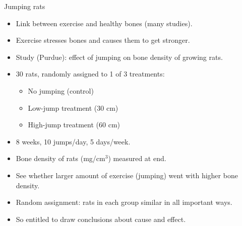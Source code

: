\documentclass[unknownkeysallowed]{beamer}\usepackage[]{graphicx}\usepackage[]{color}
\begin{document}
\begin{frame}[fragile]{Jumping rats}

  \begin{itemize}
\item Link between exercise and healthy bones (many studies).
\item Exercise stresses bones and causes them to get stronger.
\item Study (Purdue): effect of jumping on bone density of growing rats.
\item 30 rats, randomly assigned to 1 of 3 treatments:
  \begin{itemize}
  \item No jumping (control)
  \item Low-jump treatment (30 cm)
  \item High-jump treatment (60 cm)
  \end{itemize}
\item 8 weeks, 10 jumps/day, 5 days/week.
\item Bone density of rats (mg/cm$^3$) measured at end.
  \item See whether larger amount of exercise (jumping) went with
    higher bone density.
  \item Random assignment: rats in each group similar in all important
    ways.
  \item So entitled to draw conclusions about cause and effect.

  \end{itemize}

  
\end{frame}
\end{document}
